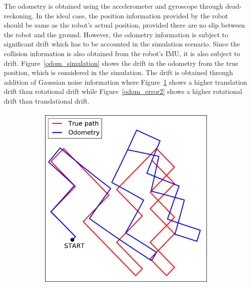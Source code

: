 The odometry is obtained using the accelerometer and gyroscope through dead-reckoning. In the ideal case, the position information provided by the robot should be same as the robot's actual position, provided there are no slip between the robot and the ground. However, the odometry information is subject to significant drift which has to be accounted in the simulation scenario. Since the collision information is also obtained from the robot's IMU, it is also subject to drift. Figure~\ref{odom_simulation} shows the drift in the odometry from the true position, which is considered in the simulation. The drift is obtained through addition of Gaussian noise information where Figure~\ref{odom_error} shows a higher translation drift than rotational drift while Figure~\ref{odom_error2} shows a higher rotational drift than translational drift.
\begin{figure}
\centering
\begin{subfigure}{0.47\textwidth}
\centering
\includegraphics[scale=0.45]{./images/odom_error}
\caption{}
\label{odom_error}
\end{subfigure}
\begin{subfigure}{0.47\textwidth}
\centering

\end{subfigure}
\end{figure}
